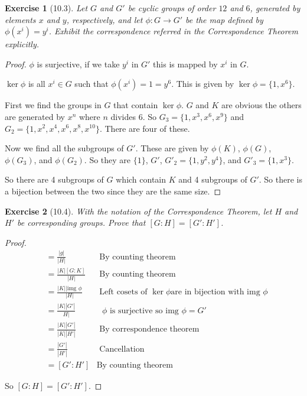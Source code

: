 \documentclass[12pt]{article}
\newtheorem*{exer}{Exercise}
\newcommand{\img}{\text{img }}
\begin{document}
\begin{exer}[10.3]
Let $G$ and $G'$ be cyclic groups of order $12$ and $6$, generated by
elements $x$ and $y$, respectively, and let $\phi: G \rightarrow G'$ be
the map defined by $\phi(x^i)=y^i$. Exhibit the correspondence  referred
in the Correspondence Theorem explicitly.
\end{exer}

\begin{proof}

    $\phi$ is surjective, if we take $y^i$ in $G'$ this is mapped by
    $x^i$ in $G$.

    $\ker \phi$ is all $x^i \in G$ such that $\phi(x^i)= 1 = y^6$. This
    is given by $\ker \phi = \{1, x^6\}$.

    First we find the groups in $G$ that contain $\ker \phi$. $G$ and
    $K$ are obvious the others are generated by $x^n$ where $n$ divides
    $6$.  So $G_3 = \{1, x^3, x^6, x^9\}$ and $G_2 = \{1, x^2, x^4, x^6,
        x^8, x^{10}\}$. There are four of these. 

    Now we find all the subgroups of $G'$. These are given by $\phi(K)$,
    $\phi(G)$, $\phi(G_3)$, and $\phi(G_2)$. So they are $\{1\}$, $G'$,
    $G'_2 = \{1, y^2, y^4\}$, and $G'_3 = \{1, x^3\}$.

    So there are 4 subgroups of $G$ which contain $K$ and 4 subgroups of
    $G'$. So there is a bijection between the two since they are the
    same size.

\end{proof}


\begin{exer}[10.4]
With the notation of the Correspondence Theorem, let $H$ and $H'$ be
corresponding groups. Prove that $[G:H]=[G':H']$.
\end{exer}

\begin{proof}

    \begin{align*}
        [G:H] &= \frac{|g|}{|H|} &\text{ By counting theorem} \\
        &= \frac{|K| [G:K]}{|H|} &\text{ By counting theorem} \\
        &= \frac{|K| |\img \phi}{|H|} &\text{ Left cosets of $\ker \phi$
        are in bijection with $\img \phi$} \\
        &= \frac{|K||G'|}{H|} &\text{ $\phi$ is surjective so $\img \phi
        = G'$} \\
        &= \frac{|K||G'|}{|K||H'|} &\text{ By correspondence theorem} \\
        &= \frac{|G'|}{|H'|} &\text{ Cancellation}\\
        &= [G':H'] &\text{By counting theorem}
    \end{align*}

    So $[G:H] = [G':H']$.

\end{proof}
\end{document}
